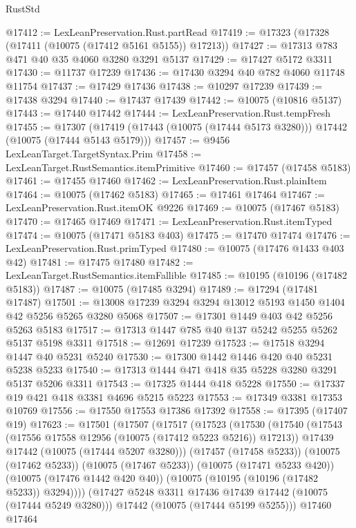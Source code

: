 \begin{lexlean}{RustStd}
\begin{coremodule}
{\begin{coremodule}
{{{{{{{{{{{{{{{{{{{{{{{{{{{{{{{{{@17412 := LexLeanPreservation.Rust.partRead
@17419 := @17323 (@17328 (@17411 (@10075 (@17412 @5161 @5155)) @17213))
@17427 := @17313 @783 @471 @40 @35 @4060 @3280 @3291 @5137
@17429 := @17427 @5172 @3311
@17430 := @11737 @17239
@17436 := @17430 @3294 @40 @782 @4060 @11748 @11754
@17437 := @17429 @17436
@17438 := @10297 @17239
@17439 := @17438 @3294
@17440 := @17437 @17439
@17442 := @10075 (@10816 @5137)
@17443 := @17440 @17442
@17444 := LexLeanPreservation.Rust.tempFresh
@17455 := @17307
    (@17419 (@17443 (@10075 (@17444 @5173 @3280))) @17442 (@10075 (@17444 @5143 @5179)))
@17457 := @9456 LexLeanTarget.TargetSyntax.Prim
@17458 := LexLeanTarget.RustSemantics.itemPrimitive
@17460 := @17457 (@17458 @5183)
@17461 := @17455 @17460
@17462 := LexLeanPreservation.Rust.plainItem
@17464 := @10075 (@17462 @5183)
@17465 := @17461 @17464
@17467 := LexLeanPreservation.Rust.itemOK @9226
@17469 := @10075 (@17467 @5183)
@17470 := @17465 @17469
@17471 := LexLeanPreservation.Rust.itemTyped
@17474 := @10075 (@17471 @5183 @403)
@17475 := @17470 @17474
@17476 := LexLeanPreservation.Rust.primTyped
@17480 := @10075 (@17476 @1433 @403 @42)
@17481 := @17475 @17480
@17482 := LexLeanTarget.RustSemantics.itemFallible
@17485 := @10195 (@10196 (@17482 @5183))
@17487 := @10075 (@17485 @3294)
@17489 := @17294 (@17481 @17487)
@17501 := @13008 @17239 @3294 @3294 @13012 @5193 @1450 @1404 @42 @5256 @5265 @3280 @5068
@17507 := @17301 @1449 @403 @42 @5256 @5263 @5183
@17517 := @17313 @1447 @785 @40 @137 @5242 @5255 @5262 @5137 @5198 @3311
@17518 := @12691 @17239
@17523 := @17518 @3294 @1447 @40 @5231 @5240
@17530 := @17300 @1442 @1446 @420 @40 @5231 @5238 @5233
@17540 := @17313 @1444 @471 @418 @35 @5228 @3280 @3291 @5137 @5206 @3311
@17543 := @17325 @1444 @418 @5228
@17550 := @17337 @19 @421 @418 @3381 @4696 @5215 @5223
@17553 := @17349 @3381 @17353 @10769
@17556 := @17550 @17553 @17386 @17392
@17558 := @17395 (@17407 @19)
@17623 := @17501
    (@17507
      (@17517
        (@17523
          (@17530
            (@17540
              (@17543 (@17556 @17558 @12956 (@10075 (@17412 @5223 @5216)) @17213))
              @17439
              @17442
              (@10075 (@17444 @5207 @3280)))
            (@17457 (@17458 @5233))
            (@10075 (@17462 @5233))
            (@10075 (@17467 @5233))
            (@10075 (@17471 @5233 @420))
            (@10075 (@17476 @1442 @420 @40))
            (@10075 (@10195 (@10196 (@17482 @5233)) @3294))))
        (@17427 @5248 @3311 @17436 @17439 @17442 (@10075 (@17444 @5249 @3280)))
        @17442
        (@10075 (@17444 @5199 @5255)))
      @17460
      @17464
}}}}}}}}}}}}}}}}}}}}}}}}}}}}}}}}}
\end{coremodule}}
\end{coremodule}
\end{lexlean}
